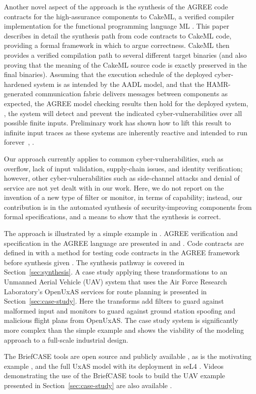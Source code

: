 Another novel aspect of the approach is the synthesis of the AGREE
code contracts for the high-assurance components to CakeML, a verified
compiler implementation for the functional programming language
ML \cite{cakeml}. This paper describes in detail the synthesis path
from code contracts to CakeML code, providing a formal framework in
which to argue correctness. CakeML then provides a verified
compilation path to several different target binaries (and also
proving that the meaning of the CakeML source code is exactly
preserved in the final binaries). Assuming that the execution schedule
of the deployed cyber-hardened system is as intended by the AADL
model, and that the HAMR-generated communication fabric delivers
messages between components as expected, the AGREE model checking
results then hold for the deployed system, \ie, the system will detect
and prevent the indicated cyber-vulnerabilities over all possible
finite inputs. Preliminary work has shown how to lift this result to
infinite input traces as these systems are inherently reactive and
intended to run forever~\cite{case-verified-filter}, \cite{cakeml-space-cost}.

Our approach currently applies to common cyber-vulnerabilities, such
as overflow, lack of input validation, supply-chain issues, and
identity verification; however, other cyber-vulnerabilities such as
side-channel attacks and denial of service are not yet dealt with in
our work.  Here, we do not report on the invention of a new type of
filter or monitor, in terms of capability; instead, our contribution
is in the automated synthesis of security-improving components from
formal specifications, and a means to show that the synthesis is
correct.

The approach is illustrated by a simple example in
. AGREE verification and specification in the AGREE
language are presented in  and .
Code contracts are defined in  with a method
for testing code contracts in the AGREE framework before synthesis given
.
The synthesis pathway is covered in Section~\ref{sec:synthesis}. A
case study applying these transformations to an Unmanned Aerial
Vehicle (UAV) system that uses the Air Force Research Laboratory's
OpenUxAS services for route planning is presented in
Section~\ref{sec:case-study}. Here the transforms add filters to guard
against malformed input and monitors to guard against ground station
spoofing and malicious flight plans from OpenUxAS. The case study
system is significantly more complex than the simple example and shows
the viability of the modeling approach to a full-scale industrial
design.

The BriefCASE tools are open source and publicly
available \cite{fmide}, as is the motivating example \cite{repo}, and
the full UxAS model with its deployment in seL4 \cite{phase2, camkes}.
Videos demonstrating the use of the BriefCASE tools to build the UAV
example presented in Section~\ref{sec:case-study} are also
available \cite{case}.
